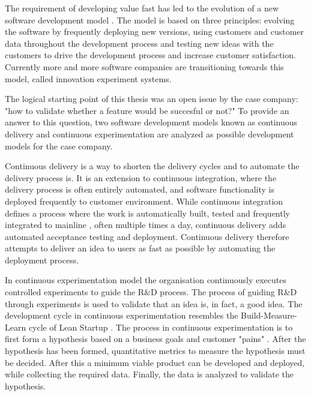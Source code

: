 \documentclass[english]{tktltiki2}
\theoremstyle{definition}
\theoremstyle{remark}
\begin{document}
The requirement of developing value fast has led to the evolution of a new software development model \cite{bosch2012building}. The model is based on three principles: evolving the software by frequently deploying new versions, using customers and customer data throughout the development process and testing new ideas with the customers to drive the development process and increase customer satisfaction. Currently more and more software companies are transitioning towards this model, called innovation experiment systems. 

The logical starting point of this thesis was an open issue by the case company: "how to validate whether a feature would be succesful or not?" To provide an answer to this question, two software development models known as continuous delivery and continuous experimentation are analyzed as possible development models for the case company.


Continuous delivery is a way to shorten the delivery cycles and to automate the delivery process is. It is an extension to continuous integration, where the delivery process is often entirely automated, and software functionality is deployed frequently to customer environment. While continuous integration defines a process where the work is automatically built, tested and frequently integrated to mainline \cite{fowler2006continuous}, often multiple times a day, continuous delivery adds automated acceptance testing and deployment. Continuous delivery therefore attempts to deliver an idea to users as fast as possible by automating the deployment process.

In continuous experimentation model the organisation continuously executes controlled experiments to guide the R\&D process. The process of guiding R\&D through experiments is used to validate that an idea is, in fact, a good idea. The development cycle in continuous experimentation resembles the Build-Measure-Learn cycle of Lean Startup \cite{ries2011lean}. The process in continuous experimentation is to first form a hypothesis based on a business goals and customer "pains" \cite{bosch2012building}. After the hypothesis has been formed, quantitative metrics to measure the hypothesis must be decided. After this a minimum viable product can be developed and deployed, while collecting the required data. Finally, the data is analyzed to validate the hypothesis.
\end{document}
